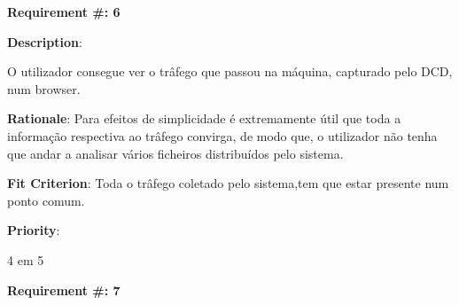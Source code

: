 \pagebreak





\begin{minipage}{0.55\textwidth}
\begin{flushleft}\textbf{Requirement \#: 6}\end{flushleft}
\end{minipage}
\begin{minipage}{0.4\textwidth}
\end{minipage}

\begin{description}
\item \textbf{Description}:

O utilizador consegue ver o trâfego que passou na máquina, capturado pelo DCD, num browser.

\item \textbf{Rationale}:
Para efeitos de simplicidade é extremamente útil que toda a informação respectiva ao trâfego convirga, de modo que, o utilizador 
não tenha que andar a analisar vários ficheiros distribuídos pelo sistema.

\item \textbf{Fit Criterion}:
Toda o trâfego coletado pelo sistema,tem que estar presente num ponto comum.

\item \textbf{Priority}:

4 em 5

\end{description}

\pagebreak






\begin{minipage}{0.55\textwidth}
\begin{flushleft}\textbf{Requirement \#: 7}\end{flushleft}
\end{minipage}
\begin{minipage}{0.4\textwidth}
\end{minipage}

